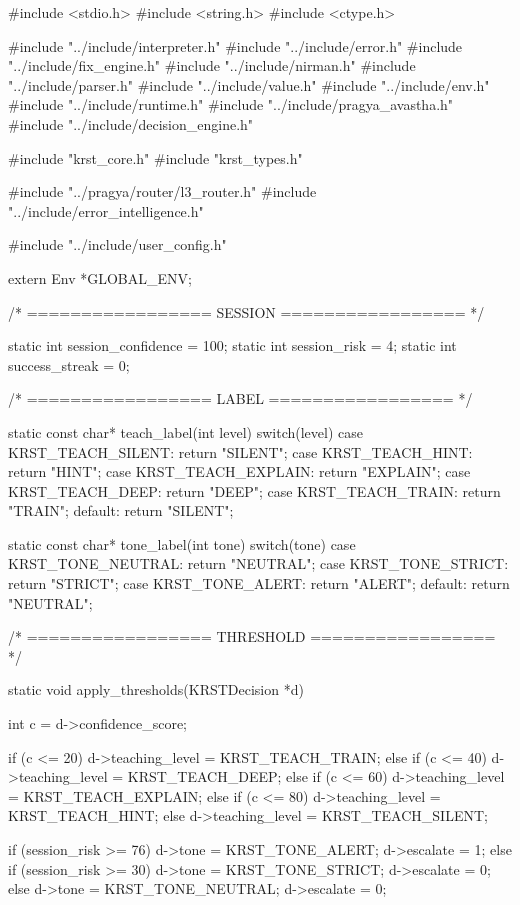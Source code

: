 \documentclass{article}
\begin{document}
#include <stdio.h>
#include <string.h>
#include <ctype.h>

#include "../include/interpreter.h"
#include "../include/error.h"
#include "../include/fix_engine.h"
#include "../include/nirman.h"
#include "../include/parser.h"
#include "../include/value.h"
#include "../include/env.h"
#include "../include/runtime.h"
#include "../include/pragya_avastha.h"
#include "../include/decision_engine.h"

#include "krst_core.h"
#include "krst_types.h"

#include "../pragya/router/l3_router.h"
#include "../include/error_intelligence.h"

#include "../include/user_config.h"

extern Env *GLOBAL_ENV;

/* ================= SESSION ================= */

static int session_confidence = 100;
static int session_risk = 4;
static int success_streak = 0;

/* ================= LABEL ================= */

static const char* teach_label(int level)
{
    switch(level)
    {
        case KRST_TEACH_SILENT:  return "SILENT";
        case KRST_TEACH_HINT:    return "HINT";
        case KRST_TEACH_EXPLAIN: return "EXPLAIN";
        case KRST_TEACH_DEEP:    return "DEEP";
        case KRST_TEACH_TRAIN:   return "TRAIN";
        default: return "SILENT";
    }
}

static const char* tone_label(int tone)
{
    switch(tone)
    {
        case KRST_TONE_NEUTRAL: return "NEUTRAL";
        case KRST_TONE_STRICT:  return "STRICT";
        case KRST_TONE_ALERT:   return "ALERT";
        default: return "NEUTRAL";
    }
}

/* ================= THRESHOLD ================= */

static void apply_thresholds(KRSTDecision *d)
{
    int c = d->confidence_score;

    if (c <= 20)      d->teaching_level = KRST_TEACH_TRAIN;
    else if (c <= 40) d->teaching_level = KRST_TEACH_DEEP;
    else if (c <= 60) d->teaching_level = KRST_TEACH_EXPLAIN;
    else if (c <= 80) d->teaching_level = KRST_TEACH_HINT;
    else              d->teaching_level = KRST_TEACH_SILENT;

    if (session_risk >= 76)
    {
        d->tone = KRST_TONE_ALERT;
        d->escalate = 1;
    }
    else if (session_risk >= 30)
    {
        d->tone = KRST_TONE_STRICT;
        d->escalate = 0;
    }
    else
    {
        d->tone = KRST_TONE_NEUTRAL;
        d->escalate = 0;
    }
}
\end{document}
